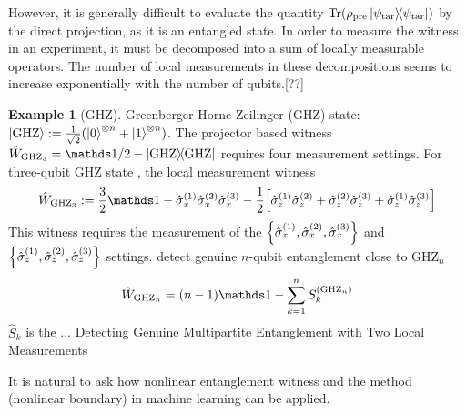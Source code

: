 \documentclass[
aps,
pra,
floatfix,
]{revtex4-2}
\theoremstyle{plain}
\newtheorem{question}{Question}
\theoremstyle{definition}
\newtheorem{example}{Example}
\newtheorem{remark}{Remark}
\newcommand{\ew}{\hat{W}}
\newcommand{\ghz}{\text{GHZ}}
\newcommand{\target}{\textup{tar}}
\newcommand{\prepare}{\textup{pre}}
\newcommand{\stbz}{\hat{S}}
\newcommand{\dm}{\rho}
\begin{document}
However, it is generally difficult to evaluate the quantity $\Tr(\dm_{\prepare} \op{\psi_{\target}})$ by the direct projection, as it is an entangled state.
In order to measure the witness in an experiment, it must be decomposed into a sum of locally measurable operators. The number of local measurements in these decompositions seems to increase exponentially with the number of qubits.[??]
\begin{example}[GHZ]\label{exm:ghz}
	Greenberger-Horne-Zeilinger (GHZ) state: $\ket{\ghz}:=\frac{1}{\sqrt{2}}(\ket{0}^{\otimes n} + \ket{1}^{\otimes n} )$.
	The projector based witness $\ew_{\ghz_3}=\identity/2 - \op{\ghz}$ requires four measurement settings.
	For three-qubit GHZ state 
	\cite{tothDetectingGenuineMultipartite2005},
	the local measurement witness
	\begin{equation}
		\ew_{\ghz_3} := \frac{3}{2} \identity - \sx^{(1)}\sx^{(2)}\sx^{(3)}
		- \frac{1}{2} \qty[
			\sz^{(1)} \sz^{(2)} + 
			\sz^{(2)} \sz^{(3)} + 
			\sz^{(1)} \sz^{(3)} 
		]
	\end{equation}
	This witness requires the measurement of the $\qty{\hat{\sigma}_x^{(1)},\hat{\sigma}_x^{(2)},\hat{\sigma}_x^{(3)}}$ and $\qty{\hat{\sigma}_z^{(1)},\hat{\sigma}_z^{(2)},\hat{\sigma}_z^{(3)}}$ settings.
	detect genuine $n$-qubit entanglement close to $\ghz_n$
	\begin{equation}
		\ew_{\ghz_n} = (n-1) \identity - \sum_{k=1}^n S_k^{(\ghz_n)}
	\end{equation}
	$\stbz_k$ is the  ... \cite{tothEntanglementDetectionStabilizer2005}
	Detecting Genuine Multipartite Entanglement with Two Local Measurements \cite{tothDetectingGenuineMultipartite2005}
\end{example}

It is natural to ask how nonlinear entanglement witness \cite{guhneNonlinearEntanglementWitnesses2006}  and the  method (nonlinear boundary) in machine learning can be applied. 
\end{document}
